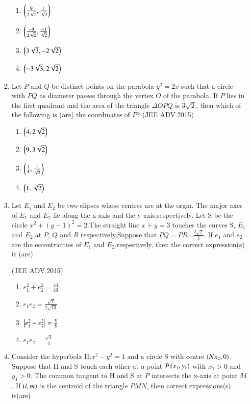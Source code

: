 \documentclass[journal,12pt,onecolumn]{IEEEtran}
\theoremstyle{remark}
\begin{document}
\begin{enumerate}
		\begin{enumerate}
			\item $\left(\frac{9}{2\sqrt{2}},\frac{1}{\sqrt{2}}\right)$ 
			\item $ \left(\frac{-9}{2\sqrt{2}},\frac{-1}{\sqrt{2}}\right)$
			\item $\left(3\sqrt{3},-2\sqrt{2}\right)$
			\item $ \left(-3\sqrt{3},2\sqrt{2}\right)$
		
		\end{enumerate}

	\item Let $P$ and $Q$ be distinct points on the parabola $y^2=2x$ such 
		that a circle with $PQ$ as diameter passes through the vertex
		$O$ of the parabola. If $P$ lies in the first quadrant and the area
		of the triangle  \(\Delta \)$OPQ$ is 3$\sqrt{2}$, then which of the following is
		(are) the coordinates of $P$?  
		\hfill(JEE ADV.2015)
		
		\begin{enumerate}
			\item $ \left(4,2\sqrt{2}\right)$
			\item $\left(9,3\sqrt{2}\right)$
			\item $ \left(\frac{1}{4},\frac{1}{\sqrt{2}}\right)$
			\item  $ \left(1,\sqrt{2}\right)$
		\end{enumerate}
	\item Let $ E_1$  and $ E_2$ be two elipses whose centres are at the orgin.
              The major axes of $E_1$ and $ E_2$ lie along the x-axis and the
              y-axis,respectively. Let S be the circle $x^2+(y-1)^2=2$.The
		straight line $x+y=3$ touches the curves S, $E_1$ and $E_2$ at $P$, $Q$
		and $R$ respectively.Suppose that $PQ=PR$=$\frac{2\sqrt{2}}{3}$. If $e_1$ and
              $e_2$ are the eccentricities of $E_1$ and $E_2$,respectively, then the 
              correct expression(s) is (are) 
	        
		\hfill(JEE ADV.2015)
		
		\begin{enumerate}
			\item $e_1^2+e_2^2=\frac{43}{40}$
			\item $e_1e_2=\frac{\sqrt{7}}{2\sqrt{10}}$
			\item $\left\vert e_1^2-e_2^2\right\vert=\frac{5}{8}$
			\item $e_1e_2=\frac{\sqrt{3}}{4}$ 
		\end{enumerate}
	\item Consider the hyperbola H:$x^2-y^2=1$ and a circle S with 
		centre $\left(Nx_2,0\right)$. Suppose that H and S touch each other at a 
	      point $P\left(x_1,y_1\right)$ with $x_1>0$ and $y_1>0$. The common tangent to H and S at $P$ intersects the x-axis at point $M$. If $\left(l,m\right)$ is the centroid of the triangle $PMN$, then correct expressions(s) is(are)
	      

\end{enumerate}
\end{document}
